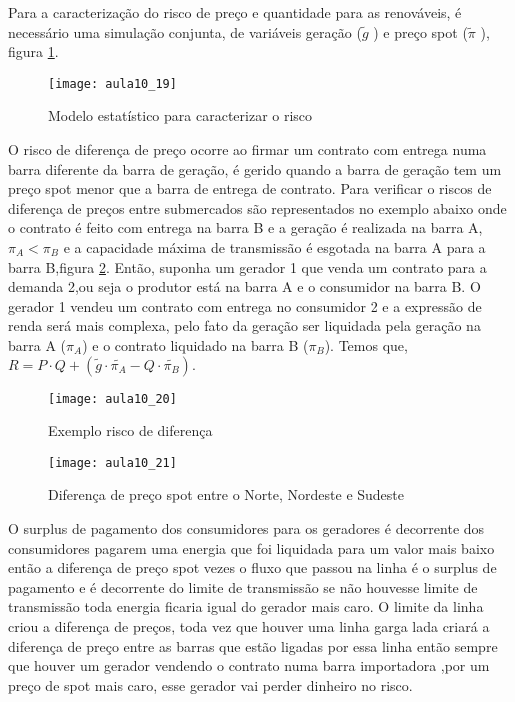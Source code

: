  Para a caracterização do risco de preço e quantidade para as renováveis, é necessário uma simulação conjunta, de variáveis geração ($\tilde{g}$ ) e preço spot ($\tilde{\pi}$ ), figura \ref{fig:aula10_19}.


\begin{figure}[H]
\begin{centering}
\texttt{[image: aula10\_19]}\protect\caption{\label{fig:aula10_19} Modelo estatístico para caracterizar o risco }
\end{centering}
\end{figure}
  O risco de diferença de preço ocorre ao firmar um contrato com entrega numa barra diferente da barra de geração, é gerido quando a barra de geração tem um preço spot menor que a barra de entrega de contrato. Para verificar o riscos de diferença de preços entre submercados são representados no exemplo abaixo onde o contrato é feito com entrega na barra B e a geração é realizada na barra A,$\pi_{A}<\pi_{B}$ e a capacidade máxima de transmissão é esgotada na barra A para a barra B,figura \ref{fig:aula10_20}.
  Então, suponha um gerador 1 que venda um contrato para a 
 demanda 2,ou seja o produtor está na barra A e o consumidor na barra B. O gerador 1 vendeu um contrato com entrega no consumidor 2 e a expressão de renda será mais complexa, pelo fato da geração ser liquidada pela geração na barra A ($\pi_{A}$) e o contrato liquidado na barra B ($\pi_{B}$).
 Temos que,
 $R=P\cdot Q+(\tilde{g}\cdot\tilde{\pi_{A}}-Q\cdot\tilde{\pi_{B}}).$
 
 
\begin{figure}[H]
\begin{centering}
\texttt{[image: aula10\_20]}\protect\caption{\label{fig:aula10_20} Exemplo risco de diferença}
\end{centering}
\end{figure}

\begin{figure}[H]
\begin{centering}
\texttt{[image: aula10\_21]}\protect\caption{\label{fig:aula10_21} Diferença de preço spot entre o Norte, Nordeste e Sudeste}
\end{centering}
\end{figure}

O surplus de pagamento dos consumidores para os geradores é decorrente dos consumidores pagarem uma energia que foi liquidada para um valor mais baixo então a diferença de preço spot vezes o fluxo que passou na linha é o surplus de pagamento e é decorrente do limite de transmissão se não houvesse limite de transmissão toda energia ficaria igual do gerador mais caro. O limite da linha criou a diferença de preços, toda vez que houver uma linha garga lada criará a diferença de preço entre as barras que estão ligadas por essa linha então sempre que houver um gerador vendendo o contrato numa barra importadora ,por um preço de spot mais caro, esse gerador vai perder dinheiro no risco. 

